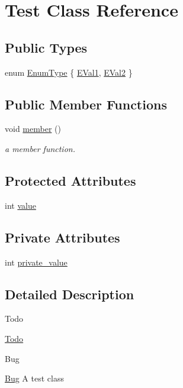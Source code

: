 \hypertarget{classTest}{}\section{Test Class Reference}
\label{classTest}
\subsection*{Public Types}
\begin{DoxyCompactItemize}
\item 
enum \hyperlink{classTest_a26bf93efdaea3c6e2cfa4119c3755d3f}{Enum\+Type} \{ \hyperlink{classTest_a26bf93efdaea3c6e2cfa4119c3755d3faacfab1e4105c05a2e503931a0e82b5b0}{E\+Val1}, 
\hyperlink{classTest_a26bf93efdaea3c6e2cfa4119c3755d3fae2fa04fb1c4db1f7d72b8781ba19ffcc}{E\+Val2}
 \}
\end{DoxyCompactItemize}
\subsection*{Public Member Functions}
\begin{DoxyCompactItemize}
\item 
void \hyperlink{classTest_ad86c7affdfb5ca8e720f44ef56169c50}{member} ()
\begin{DoxyCompactList}\small\item\em a member function. \end{DoxyCompactList}\end{DoxyCompactItemize}
\subsection*{Protected Attributes}
\begin{DoxyCompactItemize}
\item 
int \hyperlink{classTest_ad55002283eba8ffa062dfb849f6c077c}{value}
\end{DoxyCompactItemize}
\subsection*{Private Attributes}
\begin{DoxyCompactItemize}
\item 
int \hyperlink{classTest_a54d452cda3663a038c91b7dd04188be7}{private\+\_\+value}
\end{DoxyCompactItemize}


\subsection{Detailed Description}
\begin{DoxyRefDesc}{Todo}
\item[\hyperlink{todo__todo000001}{Todo}]\end{DoxyRefDesc}
\begin{DoxyRefDesc}{Bug}
\item[\hyperlink{bug__bug000001}{Bug}]A test class \end{DoxyRefDesc}



